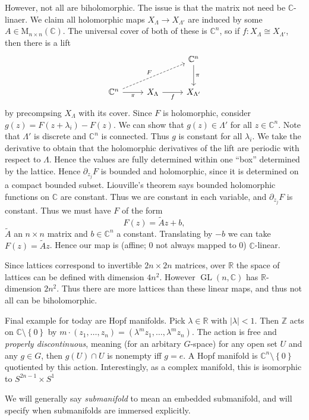 \begin{example}
	However, not all are biholomorphic. The issue is that the matrix not need be $\mathbb{C} $-linaer. We claim all holomorphic maps $X_\Lambda \to X_{\Lambda '} $ are induced by some $A\in \mathrm{M}_{n\times n} (\mathbb{C} )$. The universal cover of both of these is $\mathbb{C} ^n$, so if $f : X_{\Lambda } \cong X_{\Lambda '} $, then there is a lift
	\[\begin{tikzcd}[row sep = 2.5em, column sep = 2.5em]
	 &  & \mathbb{C} ^n\ar[" \pi  ", d]  \\
		\mathbb{C} ^n \ar[" F ", dashed, urr] \ar[" \pi  "', r]  & X_\Lambda \ar[" f "', r]  & X_{\Lambda '} 
	\end{tikzcd}\]
	by precompsing $X_\Lambda $ with its cover. Since $F$ is holomorphic, consider $g(z)=F(z+\lambda _i )-F(z)$. We can show that $g(z)\in \Lambda '$ for all $z\in\mathbb{C} ^n$. Note that $\Lambda '$ is discrete and $\mathbb{C} ^n$ is connected. Thus $g$ is constant for all $\lambda_i $. We take the derivative to obtain that the holomorphic derivatives of the lift are periodic with respect to $\Lambda $. Hence the values are fully determined within one ``box'' determined by the lattice. Hence $\partial _{z_j} F$ is bounded and holomorphic, since it is determined on a compact bounded subset. Liouville's theorem says bounded holomorphic functions on $\mathbb{C} $ are constant. Thus we are constant in each variable, and $\partial _{z_j} F$ is constant. Thus we must have $F$ of the form
	\[
		F(z)= \widetilde{A} z + b,
	\]
	$\widetilde{A} $ an $n\times n$ matrix and $b\in\mathbb{C} ^n$ a constant. Translating by $-b$ we can take $F(z)= \widetilde{A} z$. Hence our map is (affine; 0 not always mapped to 0) $\mathbb{C} $-linear.

Since lattices correspond to invertible $2n\times 2n$ matrices, over $\mathbb{R} $ the space of lattices can be defined with dimension $4n^2$. However $\operatorname{GL} (n,\mathbb{C} )$ has $\mathbb{R} $-dimension $2n^2$. Thus there are more lattices than these linear maps, and thus not all can be biholomorphic.

Final example for today are Hopf manifolds. Pick $\lambda \in\mathbb{R} $ with $\left| \lambda  \right| <1$. Then $\mathbb{Z} $ acts on $\mathbb{C} \setminus \left\{ 0 \right\} $ by $m\cdot (z_1, \ldots ,z_n)=(\lambda ^mz_1, \ldots ,\lambda ^mz_n)$. The action is free and \emph{properly discontinuous}, meaning (for an arbitary $G$-space) for any open set $U$ and any $g\in G$, then $g(U)\cap U$ is nonempty iff $g=e$. A Hopf manifold is $\mathbb{C} ^n\setminus \left\{ 0 \right\} $ quotiented by this action. Interestingly, as a complex manifold, this is isomorphic to $S^{2n-1} \times S^1$
\end{example}

We will generally say \emph{submanifold} to mean an embedded submanifold, and will specify when submanifolds are immersed explicitly.
